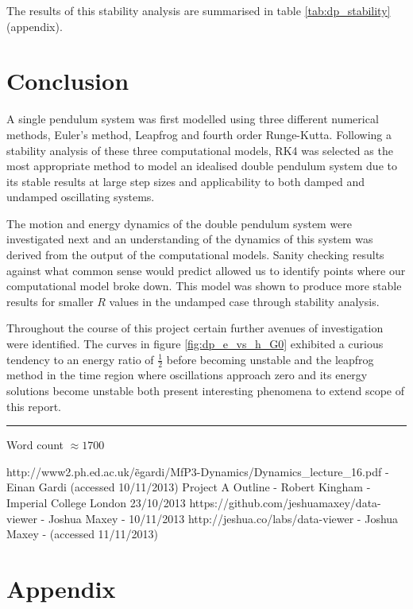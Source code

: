 \documentclass[11pt]{article}
\begin{document}
The results of this stability analysis are summarised in table \ref{tab:dp_stability} (appendix).

\section{Conclusion}
A single pendulum system was first modelled using three different numerical methods, Euler's method, Leapfrog and fourth order Runge-Kutta. Following a stability analysis of these three computational models, RK4 was selected as the most appropriate method to model an idealised double pendulum system due to its stable results at large step sizes and applicability to both damped and undamped oscillating systems.

The motion and energy dynamics of the double pendulum system were investigated next and an understanding of the dynamics of this system was derived from the output of the computational models. Sanity checking results against what common sense would predict allowed us to identify points where our computational model broke down. This model was shown to produce more stable results for smaller $R$ values in the undamped case through stability analysis.

Throughout the course of this project certain further avenues of investigation were identified. The curves in figure \ref{fig:dp_e_vs_h_G0} exhibited a curious tendency to an energy ratio of $\frac{1}{2}$ before becoming unstable and the leapfrog method in the time region where oscillations approach zero and its energy solutions become unstable both present interesting phenomena to extend scope of this report.

\vspace{15pt}
\hrule
\vspace{15pt}
Word count $\approx 1700$

\begin{thebibliography}{10}
 http://www2.ph.ed.ac.uk/\~egardi/MfP3-Dynamics/Dynamics\_lecture\_16.pdf - Einan Gardi (accessed 10/11/2013)
 Project A Outline - Robert Kingham - Imperial College London 23/10/2013
 https://github.com/jeshuamaxey/data-viewer - Joshua Maxey - 10/11/2013
 http://jeshua.co/labs/data-viewer - Joshua Maxey - (accessed 11/11/2013)
\end{thebibliography}

\newpage
\section{Appendix} \label{app:Appendix}
\end{document}
